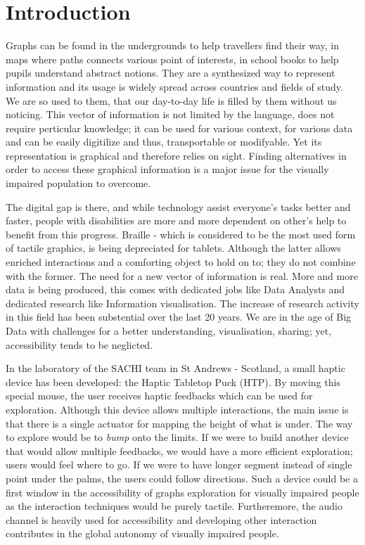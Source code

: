\section{Introduction}

Graphs can be found in the undergrounds to help travellers find their
way, in maps where paths connects various point of interests, in school
books to help pupils understand abstract notions. They are a synthesized
way to represent information and its usage is widely spread across
countries and fields of study. We are so used to them, that our
day-to-day life is filled by them without us noticing. This vector of
information is not limited by the language, does not require perticular
knowledge; it can be used for various context, for various data and can
be easily digitilize and thus, transportable or modifyable. Yet its
representation is graphical and therefore relies on sight. Finding
alternatives in order to access these graphical information is a major
issue for the visually impaired population to overcome. 

The digital gap is there, and while technology assist everyone's tasks
better and faster, people with disabilities are more and more dependent
on other's help to benefit from this progress. Braille - which is
considered to be the most used form of tactile graphics, is being
depreciated for tablets. Although the latter allows enriched
interactions and a comforting object to hold on to; they do not combine
with the former. The need for a new vector of information is real. More
and more data is being produced, this comes with dedicated jobs like
Data Analysts and dedicated research like Information visualisation. The
increase of research activity in this field has been substential over
the last 20 years. We are in the age of Big Data with challenges for a
better understanding, visualisation, sharing; yet, accessibility tends
to be neglicted.

In the laboratory of the SACHI team in St Andrews - Scotland, a small
haptic device has been developed: the Haptic Tabletop Puck (HTP). By
moving this special mouse, the user receives haptic feedbacks which can
be used for exploration. Although this device allows multiple
interactions, the main issue is that there is a single actuator for
mapping the height of what is under. The way to explore would be to
\emph{bump} onto the limits. If we were to build another device that
would allow multiple feedbacks, we would have a more efficient
exploration; users would feel where to go. If we were to have longer
segment instead of single point under the palms, the users could follow
directions. Such a device could be a first window in the accessibility
of graphs exploration for visually impaired people as the interaction
techniques would be purely tactile. Furtheremore, the audio channel is
heavily used for accessibility and developing other interaction
contributes in the global autonomy of visually impaired people.

